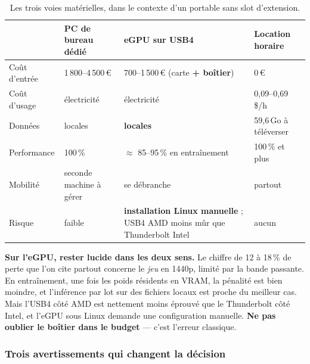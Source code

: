 \documentclass[11pt,a4paper]{article}
\newcommand{\alerte}[1]{\textcolor{alerte}{\textbf{#1}}}
\begin{document}
\begin{table}[h]
\centering
\small
\begin{tabularx}{\textwidth}{lYYY}
\toprule
 & \textbf{PC de bureau dédié} & \textbf{eGPU sur USB4} & \textbf{Location horaire} \\
\midrule
Coût d'entrée   & 1\,800--4\,500\,\euro{} & 700--1\,500\,\euro{} (carte \textbf{+ boîtier}) & 0\,\euro{} \\
\addlinespace
Coût d'usage    & électricité & électricité & 0,09--0,69 \$/h \\
\addlinespace
Données         & locales & \textbf{locales} & 59,6\,Go à téléverser \\
\addlinespace
Performance     & 100\,\% & $\approx$ 85--95\,\% en entraînement & 100\,\% et plus \\
\addlinespace
Mobilité        & seconde machine à gérer & se débranche & partout \\
\addlinespace
Risque          & faible & \textbf{installation Linux manuelle} ; USB4 AMD moins mûr que Thunderbolt Intel & aucun \\
\bottomrule
\end{tabularx}
\caption{Les trois voies matérielles, dans le contexte d'un portable sans slot
d'extension.}
\end{table}

\textbf{Sur l'eGPU, rester lucide dans les deux sens.} Le chiffre de 12 à 18\,\%
de perte que l'on cite partout concerne le \emph{jeu} en 1440p, limité par la
bande passante. En entraînement, une fois les poids résidents en VRAM, la
pénalité est bien moindre, et l'inférence par lot sur des fichiers locaux est
proche du meilleur cas. Mais l'USB4 côté AMD est nettement moins éprouvé que le
Thunderbolt côté Intel, et l'eGPU sous Linux demande une configuration manuelle.
\alerte{Ne pas oublier le boîtier dans le budget} — c'est l'erreur classique.

\subsubsection*{Trois avertissements qui changent la décision}
\end{document}
